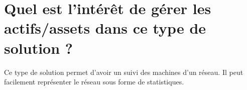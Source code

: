 \section{Quel est l’intérêt de gérer les actifs/assets dans ce type de solution ?}
Ce type de solution permet d'avoir un suivi des machines d'un réseau. Il peut facilement représenter le réseau sous forme de statistiques. \\
